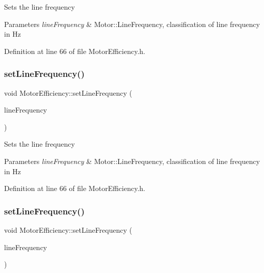 Sets the line frequency 
\begin{DoxyParams}{Parameters}
{\em line\+Frequency} & Motor\+::\+Line\+Frequency, classification of line frequency in Hz \\
\hline
\end{DoxyParams}


Definition at line 66 of file Motor\+Efficiency.\+h.

\mbox{\label{class_motor_efficiency_a993b09941d330d3a46e0d72bd6dc65bb}} 
\subsubsection{\texorpdfstring{set\+Line\+Frequency()}{setLineFrequency()}\hspace{0.1cm}{\footnotesize\ttfamily [2/3]}}
{\footnotesize\ttfamily void Motor\+Efficiency\+::set\+Line\+Frequency (\begin{DoxyParamCaption}\item[{Motor\+::\+Line\+Frequency}]{line\+Frequency }\end{DoxyParamCaption})\hspace{0.3cm}{\ttfamily [inline]}}

Sets the line frequency 
\begin{DoxyParams}{Parameters}
{\em line\+Frequency} & Motor\+::\+Line\+Frequency, classification of line frequency in Hz \\
\hline
\end{DoxyParams}


Definition at line 66 of file Motor\+Efficiency.\+h.

\mbox{\label{class_motor_efficiency_a993b09941d330d3a46e0d72bd6dc65bb}} 
\subsubsection{\texorpdfstring{set\+Line\+Frequency()}{setLineFrequency()}\hspace{0.1cm}{\footnotesize\ttfamily [3/3]}}
{\footnotesize\ttfamily void Motor\+Efficiency\+::set\+Line\+Frequency (\begin{DoxyParamCaption}\item[{Motor\+::\+Line\+Frequency}]{line\+Frequency }\end{DoxyParamCaption})\hspace{0.3cm}{\ttfamily [inline]}}

